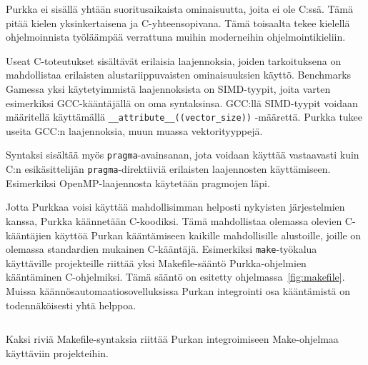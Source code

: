 Purkka ei sisällä yhtään suoritusaikaista ominaisuutta, joita ei ole C:ssä.
Tämä pitää kielen yksinkertaisena ja C-yhteensopivana. Tämä toisaalta tekee
kielellä ohjelmoinnista työläämpää verrattuna muihin moderneihin
ohjelmointikieliin.

Useat C-toteutukset sisältävät erilaisia laajennoksia, joiden tarkoituksena on
mahdollistaa erilaisten alustariippuvaisten ominaisuuksien käyttö. Benchmarks
Gamessa yksi käytetyimmistä laajennoksista on SIMD-tyypit, joita varten
esimerkiksi GCC-kääntäjällä on oma syntaksinsa. GCC:llä SIMD-tyypit voidaan
määritellä käyttämällä \texttt{\_\_attribute\_\_((vector\_size))} -määrettä.
Purkka tukee useita GCC:n laajennoksia, muun muassa vektorityyppejä.

Syntaksi sisältää myös \texttt{pragma}-avainsanan, jota voidaan käyttää
vastaavasti kuin C:n esikäsittelijän \texttt{pragma}-direktiiviä erilaisten
laajennosten käyttämiseen. Esimerkiksi OpenMP-laajennosta käytetään pragmojen
läpi.

Jotta Purkkaa voisi käyttää mahdollisimman helposti nykyisten järjestelmien
kanssa, Purkka käännetään C-koodiksi. Tämä mahdollistaa olemassa olevien
C-kääntäjien käyttöä Purkan kääntämiseen kaikille mahdollisille alustoille,
joille on olemassa standardien mukainen C-kääntäjä. Esimerkiksi
\texttt{make}-työkalua käyttäville projekteille riittää yksi Makefile-sääntö
Purkka-ohjelmien kääntäminen C-ohjelmiksi. Tämä sääntö on esitetty
ohjelmassa~\ref{fig:makefile}. Muissa käännösautomaatiosovelluksissa Purkan
integrointi osa kääntämistä on todennäköisesti yhtä helppoa.

\begin{listing}[ht!]
    \inputminted{Makefile}{koodi/Makefile.kieli}
    \caption{Kaksi riviä Makefile-syntaksia riittää Purkan integroimiseen
    Make-ohjelmaa käyttäviin projekteihin.}
    \label{fig:makefile}
\end{listing}
